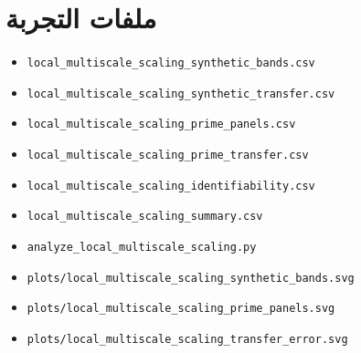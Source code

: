 \documentclass[12pt]{article}
\begin{document}
\section{ملفات التجربة}

\begin{itemize}
\item \texttt{local\_multiscale\_scaling\_synthetic\_bands.csv}
\item \texttt{local\_multiscale\_scaling\_synthetic\_transfer.csv}
\item \texttt{local\_multiscale\_scaling\_prime\_panels.csv}
\item \texttt{local\_multiscale\_scaling\_prime\_transfer.csv}
\item \texttt{local\_multiscale\_scaling\_identifiability.csv}
\item \texttt{local\_multiscale\_scaling\_summary.csv}
\item \texttt{analyze\_local\_multiscale\_scaling.py}
\item \texttt{plots/local\_multiscale\_scaling\_synthetic\_bands.svg}
\item \texttt{plots/local\_multiscale\_scaling\_prime\_panels.svg}
\item \texttt{plots/local\_multiscale\_scaling\_transfer\_error.svg}
\end{itemize}
\end{document}

